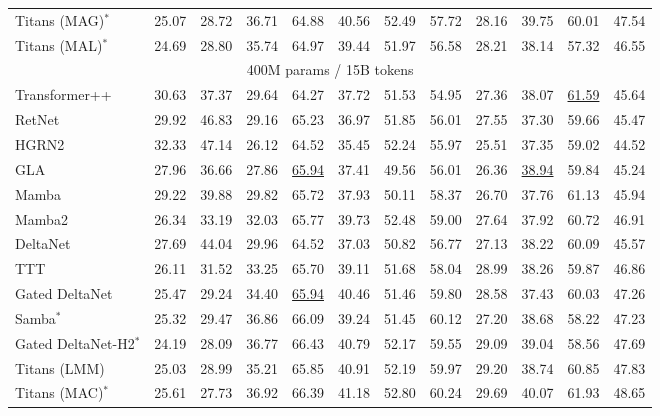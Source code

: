 \begin{table*}[t!]
{\begin{tabular}{l|c c|c c c c c c c c c}
Titans (MAG)$^*$         & 25.07 & 28.72 & \cellcolor{mygreen}36.71 & 64.88 & \cellcolor{mygreen}40.56 & \cellcolor{mygreen}52.49 & 57.72& 28.16 & \cellcolor{mygreen}39.75 & 60.01& \cellcolor{mygreen}47.54 \\
Titans (MAL)$^*$         & \cellcolor{mygreen}24.69 & 28.80 & 35.74  & 64.97 & 39.44 & 51.97 & 56.58  & 28.21 & 38.14 & 57.32 & 46.55\\
\midrule
\multicolumn{12}{c}{400M params / 15B tokens} \\
\midrule
 Transformer++ & 30.63 & 37.37 & 29.64 & 64.27 & 37.72 &	51.53 & 54.95	& 27.36 &  38.07  &  \cellcolor{myblue}\underline{61.59}  & 45.64 \\
 RetNet & 29.92 & 46.83 & 29.16 & 65.23 & 36.97 &	51.85 & 56.01	& 27.55 &  37.30  & 59.66  & 45.47 \\
 HGRN2 & 32.33 & 47.14 & 26.12 & 64.52 & 35.45 &	52.24 & 55.97	& 25.51 &  37.35  & 59.02  & 44.52 \\
GLA & 27.96 & 36.66 & 27.86 &  \cellcolor{myblue}\underline{65.94} & 37.41 &	49.56 & 56.01	& 26.36 &   \cellcolor{myblue}\underline{38.94}  & 59.84  & 45.24 \\
 Mamba & 29.22 & 39.88 & 29.82 & 65.72 & 37.93 &	50.11 & 58.37	& 26.70 &  37.76  & 61.13  & 45.94 \\
Mamba2 & 26.34 & 33.19 & 32.03 & 65.77 & 39.73 &	{52.48} & 59.00	& 27.64 &  37.92  & 60.72  & 46.91 \\
 DeltaNet & 27.69 & 44.04 & 29.96 & 64.52 & 37.03 &	50.82 & 56.77	& 27.13 &  38.22  & 60.09  & 45.57 \\
 TTT & 26.11 & 31.52 & 33.25 & 65.70 & 39.11 & 51.68& 58.04& 28.99 & 38.26 & 59.87 & 46.86\\
Gated DeltaNet & 25.47 & 29.24 & 34.40 &  \cellcolor{myblue}\underline{65.94} & 40.46 &	51.46 & {59.80}	& {28.58} &  37.43  & 60.03  & 47.26 \\
 Samba$^*$ & 25.32 & 29.47 & 36.86 & 66.09& 39.24 & 51.45 & 60.12 & 27.20  & 38.68  &  58.22 & 47.23\\
Gated DeltaNet-H2$^*$  & {24.19} & {28.09} & {36.77} & {66.43} & {40.79} &	{52.17} & 59.55	& {29.09} &  {39.04}  & 58.56  & {47.69} \\
\midrule
Titans (LMM) & \cellcolor{myblue}25.03 & \cellcolor{myblue} 28.99  & \cellcolor{myblue}35.21 & 65.85 & \cellcolor{myblue}40.91 & \cellcolor{myblue}52.19 & \cellcolor{myblue} 59.97 & \cellcolor{myblue}29.20 & 38.74 & 60.85 &  \cellcolor{myblue}47.83  \\
Titans (MAC)$^*$         & 25.61 & \cellcolor{mygreen}27.73  &     36.92 & 66.39 & \cellcolor{mygreen}41.18 & 52.80 & \cellcolor{mygreen}60.24 & 29.69 & \cellcolor{mygreen}40.07  & \cellcolor{mygreen}61.93 & \cellcolor{mygreen}48.65 \\

\end{tabular}}
\end{table*}
